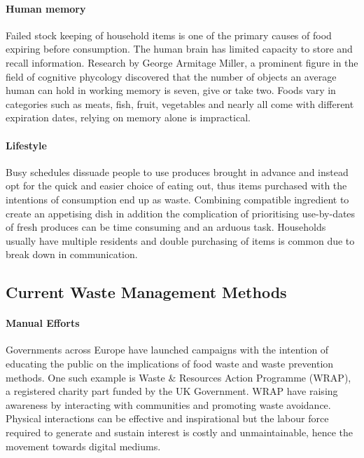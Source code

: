 \documentclass[a4paper, 11pt]{article}
\begin{document}
\paragraph{Human memory}Failed stock keeping of household items is one of the primary causes of food expiring before consumption. The human brain has limited capacity to store and recall information. Research by George Armitage Miller, a prominent figure in the field of cognitive phycology discovered that the number of objects an average human can hold in working memory is seven, give or take two.\cite{memory} Foods vary in categories such as meats, fish, fruit, vegetables and nearly all come with different expiration dates, relying on memory alone is impractical. 

\paragraph{Lifestyle} Busy schedules dissuade people to use produces brought in advance and instead opt for the quick and easier choice of eating out, thus items purchased with the intentions of consumption end up as waste.\cite{motivation} Combining compatible ingredient to create an appetising dish in addition the complication of prioritising use-by-dates of fresh produces can be time consuming and an arduous task. Households usually have multiple residents and double purchasing of items is common due to break down in communication.

\vspace{\baselineskip}
\vspace{\baselineskip}
\vspace{\baselineskip}

\subsection{Current Waste Management Methods}

\paragraph{Manual Efforts}
Governments across Europe have launched campaigns with the intention of educating the public on the implications of food waste and waste prevention methods. One such example is Waste \& Resources Action Programme (WRAP), a registered charity part funded by the UK Government. WRAP have raising awareness by interacting with communities and promoting waste avoidance. Physical interactions can be effective and inspirational but the labour force required to generate and sustain interest is costly and unmaintainable, hence the movement towards digital mediums.\cite{FoodWaste}
\end{document}
